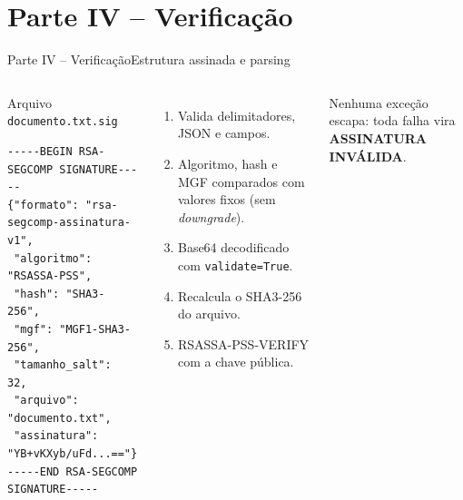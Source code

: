 \documentclass[10pt,aspectratio=169]{beamer}
\begin{document}
\section{Parte IV -- Verificação}
\begin{frame}[fragile]{Parte IV -- Verificação}{Estrutura assinada e parsing}
  \begin{columns}[T,onlytextwidth]
      \begin{block}{Arquivo \texttt{documento.txt.sig}}
\scriptsize
\begin{verbatim}
-----BEGIN RSA-SEGCOMP SIGNATURE-----
{"formato": "rsa-segcomp-assinatura-v1",
 "algoritmo": "RSASSA-PSS",
 "hash": "SHA3-256",
 "mgf": "MGF1-SHA3-256",
 "tamanho_salt": 32,
 "arquivo": "documento.txt",
 "assinatura": "YB+vKXyb/uFd...=="}
-----END RSA-SEGCOMP SIGNATURE-----
\end{verbatim}
      \end{block}
      \begin{enumerate}
        \item Valida delimitadores, JSON e campos.
        \item Algoritmo, hash e MGF comparados com valores fixos (sem \textit{downgrade}).
        \item Base64 decodificado com \texttt{validate=True}.
        \item Recalcula o SHA3-256 do arquivo.
        \item RSASSA-PSS-VERIFY com a chave pública.
      \end{enumerate}
      \vspace{4pt}
      \small Nenhuma exceção escapa: toda falha vira \textbf{ASSINATURA INVÁLIDA}.
  \end{columns}
\end{frame}
\end{document}
